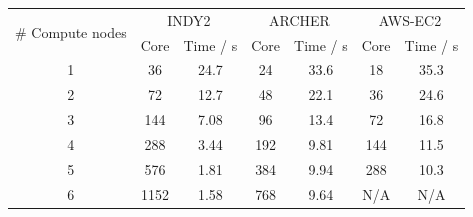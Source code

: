 \begin{center}

\label{table:perf}

\begin{tabular}{|c|c|c|c|c|c|c|}
\hline
\multirow{2}{*}{\# Compute nodes} & \multicolumn{2}{c|}{INDY2} & \multicolumn{2}{c|}{ARCHER} & \multicolumn{2}{c|}{AWS-EC2} \\ \cline{2-7} 
                                  & Core       & Time / s      & Core       & Time / s       & Core        & Time / s       \\ \hline
1                                 & 36         & 24.7          & 24         & 33.6           & 18          & 35.3           \\
2                                 & 72         & 12.7          & 48         & 22.1           & 36          & 24.6           \\
3                                 & 144        & 7.08          & 96         & 13.4           & 72          & 16.8           \\
4                                 & 288        & 3.44          & 192        & 9.81           & 144         & 11.5           \\
5                                 & 576        & 1.81          & 384        & 9.94           & 288         & 10.3           \\
6                                 & 1152       & 1.58          & 768        & 9.64           & N/A         & N/A            \\ \hline
\end{tabular}

\end{center}



\vspace{0.5cm}


